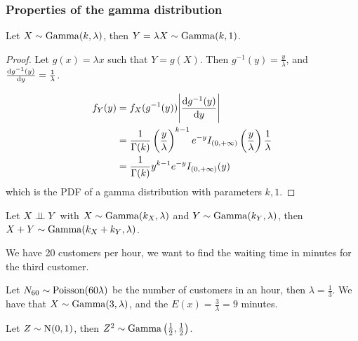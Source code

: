 \documentclass[12pt]{extarticle}
\newcommand{\Normal}{{\operatorfont N}}
\newcommand{\GammaD}{{\operatorfont Gamma}}
\newcommand{\Poisson}{{\operatorfont Poisson}}
\begin{document}
\subsubsection{Properties of the gamma distribution}

\begin{theorem}
    Let $X \sim \GammaD(k, \lambda)$, then $Y = \lambda X \sim \GammaD(k, 1)$.
\end{theorem}

\begin{proof}
    Let $g(x) = \lambda x$ such that $Y = g(X)$.
    Then $g^{-1}(y) = \frac{y}{\lambda}$, and $\dv{g^{-1}(y)}{y} = \frac{1}{\lambda}$.

    \begin{align}
        f_Y(y) & = f_X(g^{-1}(y)) \abs{\dv{g^{-1}(y)}{y}}                                                                                           \\
               & = \frac{1}{\Gamma(k)} \left(\frac{y}{\lambda}\right)^{k-1} e^{-y} I_{(0, +\infty)}\left(\frac{y}{\lambda}\right) \frac{1}{\lambda} \\
               & = \frac{1}{\Gamma(k)} y^{k-1} e^{-y} I_{(0, +\infty)}(y)                                                                           \\
    \end{align}
    which is the PDF of a gamma distribution with parameters $k, 1$.
\end{proof}

\begin{theorem}
    Let $X \perp \!\!\! \perp Y$ with $X \sim \GammaD(k_X, \lambda)$ and $Y \sim \GammaD(k_Y, \lambda)$, then $X + Y \sim \GammaD(k_X + k_Y, \lambda)$.
\end{theorem}

\begin{example}
    We have 20 customers per hour, we want to find the waiting time in minutes for the third customer.

    Let $N_{60} \sim \Poisson(60\lambda)$ be the number of customers in an hour, then $\lambda = \frac{1}{3}$.
    We have that $X \sim \GammaD(3, \lambda)$, and the $E(x) = \frac{3}{\lambda} = 9$ minutes.
\end{example}

\begin{theorem}
    Let $Z \sim \Normal(0, 1)$, then $Z^2 \sim \GammaD\left(\frac{1}{2}, \frac{1}{2}\right)$.
\end{theorem}
\end{document}
